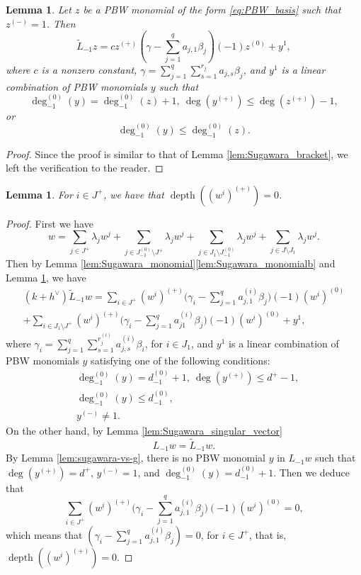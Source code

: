 \documentclass[JEP,XML,SOM,Unicode]{cedram}
\let\oldvee\vee
\renewcommand{\vee}{{\scriptscriptstyle\oldvee}}
\let\be\beta
\DeclareMathOperator{\dep}{depth}
\newtheorem{lem}[theorem]{Lemma}
\theoremstyle{definition}
\begin{document}
\begin{lem}\label{Sugawara1}
Let $z$ be a PBW monomial of the form \eqref{eq:PBW_basis}
such that $z^{(-)}=1$. Then
\begin{equation*}
\tilde{L}_{-1}z
= c z^{(+)}(\gamma-\sum_{j=1}^qa_{j,1}\be_j)(-1)z^{(0)}+y^1,
\end{equation*}
where $c$ is a nonzero constant,
$\gamma=\sum_{j=1}^q\sum_{s=1}^{r_j}a_{j,s}\be_j$, and
$y^1$ is a linear combination of PBW monomials $y$ such that
\[
\deg_{-1}^{(0)}(y)=\deg_{-1}^{(0)}(z)+1, \ \deg(y^{(+)})\leq \deg(z^{(+)})-1,
\]
or
\[
\deg_{-1}^{(0)}(y)\leq \deg_{-1}^{(0)}(z).
\]
\end{lem}
\begin{proof}
Since the proof is similar to that of Lemma \ref{lem:Sugawara_bracket},
we left the verification to the reader.
\end{proof}

{
\begin{lem}\label{lem:wi_+}
For $i\in J^+$, we have that $\dep((w^i)^{(+)})=0$.
\end{lem}
\begin{proof} First we have
\[
w = \sum_{j \in J^+} \lambda_j w^j+\sum_{j \in J_{-1}^{(0)}\setminus J^+} \lambda_j w^j+\sum_{j \in J_1\setminus J_{-1}^{(0)}} \lambda_j w^j+\sum_{j \in J\setminus J_1} \lambda_j w^j.
\]
Then by Lemma \ref{lem:Sugawara_monomial}\eqref{lem:Sugawara_monomialb} and Lemma \ref{Sugawara1}, we have
\begin{multline*}
(k+h^{\vee})\tilde{L}_{-1}w
=\sum_{i\in J^+}(w^i)^{(+)} \biggl(\gamma_i-\sum_{j=1}^q
a_{j,1}^{(i)}\be_j\biggr)(-1)(w^i)^{(0)}\\[-8pt]
+\sum_{i\in J_1\setminus J^+}(w^i)^{(+)}\biggl(\gamma_i-\sum_{j=1}^qa^{(i)}_{j1}\be_j\biggr)(-1)(w^i)^{(0)}+y^1,
\end{multline*}
where
{$\gamma_i=\sum_{j=1}^q\sum_{s=1}^{r^{(i)}_j}a^{(i)}_{j,s}\be_i$},
for $i\in J_1$, and $y^1$ is a linear combination of PBW monomials $y$ satisfying
one of the following conditions:
\begin{align*}
& \deg_{-1}^{(0)}(y)=d_{-1}^{(0)}+1, \ \deg(y^{(+)})\leq d^+-1,\\
& \deg_{-1}^{(0)}(y)\leq d_{-1}^{(0)},\\
& y^{(-)}\neq 1.
\end{align*}
On the other hand, by Lemma \ref{lem:Sugawara_singular_vector}
\[
L_{-1}w=\tilde{L}_{-1}w.
\]
By Lemma \ref{lem:sugawara-vs-g}, there is no PBW monomial $y$ in $L_{-1}w$ such that $\deg(y^{(+)})=d^+$, $y^{(-)}=1$, and $\deg_{-1}^{(0)}(y)=d_{-1}^{(0)}+1$. Then we deduce that
\[
\sum_{i\in J^+}(w^i)^{(+)}\biggl(\gamma_i-\sum_{j=1}^qa_{j,1}^{(i)}\be_j\biggr)(-1)(w^i)^{(0)}=0,
\]
which means that ${(\gamma_i-\sum_{j=1}^qa_{j,1}^{(i)}\be_j)}=0$, for $i\in J^+$, that is, $\dep((w^i)^{(+)})=0$.
\end{proof}}
\end{document}
